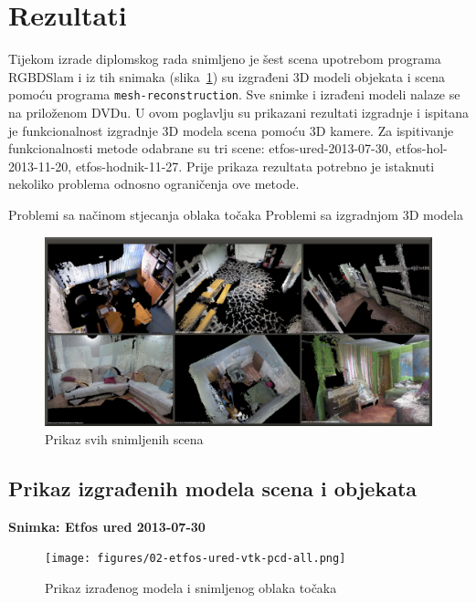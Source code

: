 \newpage
\setcounter{figure}{0}

\section{Rezultati} %
\label{sec:Rezultati}

Tijekom izrade diplomskog rada snimljeno je šest scena upotrebom
programa RGBDSlam i iz tih snimaka (slika~\ref{fig:01-all.png}) su
izgrađeni 3D modeli objekata i scena pomoću programa
\texttt{mesh-reconstruction}. Sve snimke i izrađeni modeli nalaze se na
priloženom DVDu. U ovom poglavlju su prikazani rezultati izgradnje i
ispitana je funkcionalnost izgradnje 3D modela scena pomoću 3D kamere.
Za ispitivanje funkcionalnosti metode odabrane su tri scene:
etfos-ured-2013-07-30, etfos-hol-2013-11-20, etfos-hodnik-11-27. Prije
prikaza rezultata potrebno je istaknuti nekoliko problema odnosno
ograničenja ove metode.

Problemi sa načinom stjecanja oblaka točaka
Problemi sa izgradnjom 3D modela 

\begin{figure}[h]
\centering
\includegraphics[scale=0.15]{figures/01-all-pcd.png}
\caption{Prikaz svih snimljenih scena}
\label{fig:01-all.png}
\end{figure}

\newpage
\subsection{Prikaz izgrađenih modela scena i objekata} %
\label{sub:Prikaz izgradenih modela scena i objekata}

\textbf{Snimka: Etfos ured 2013-07-30} 

\begin{figure}[h]
\centering
\texttt{[image: figures/02-etfos-ured-vtk-pcd-all.png]}
\caption{Prikaz izrađenog modela i snimljenog oblaka točaka}
\label{fig:02-etfos-ured-vtk-pcd.png}
\end{figure}



